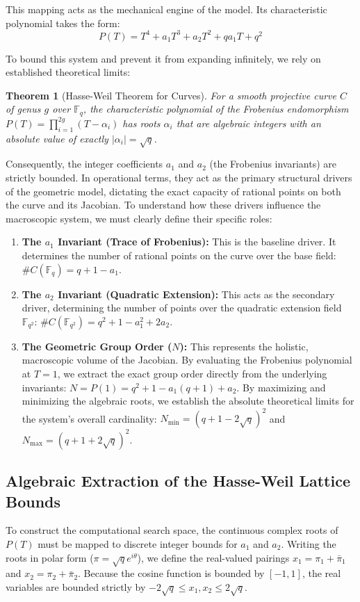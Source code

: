 \documentclass[11pt,letterpaper]{article}
\newtheorem{theorem}{Theorem}[section]
\begin{document}
This mapping acts as the mechanical engine of the model. Its characteristic polynomial takes the form:
\[ P(T) = T^4 + a_1 T^3 + a_2 T^2 + q a_1 T + q^2 \]

To bound this system and prevent it from expanding infinitely, we rely on established theoretical limits:

\begin{theorem}[Hasse-Weil Theorem for Curves]
For a smooth projective curve $C$ of genus $g$ over $\mathbb{F}_q$, the characteristic polynomial of the Frobenius endomorphism $P(T) = \prod_{i=1}^{2g} (T - \alpha_i)$ has roots $\alpha_i$ that are algebraic integers with an absolute value of exactly $|\alpha_i| = \sqrt{q}$.
\end{theorem}

Consequently, the integer coefficients $a_1$ and $a_2$ (the Frobenius invariants) are strictly bounded. In operational terms, they act as the primary structural drivers of the geometric model, dictating the exact capacity of rational points on both the curve and its Jacobian. To understand how these drivers influence the macroscopic system, we must clearly define their specific roles:

\begin{enumerate}
\item \textbf{The $a_1$ Invariant (Trace of Frobenius):} This is the baseline driver. It determines the number of rational points on the curve over the base field: $\#C(\mathbb{F}_q) = q + 1 - a_1$.
\item \textbf{The $a_2$ Invariant (Quadratic Extension):} This acts as the secondary driver, determining the number of points over the quadratic extension field $\mathbb{F}_{q^2}$: $\#C(\mathbb{F}_{q^2}) = q^2 + 1 - a_1^2 + 2a_2$.
\item \textbf{The Geometric Group Order ($N$):} This represents the holistic, macroscopic volume of the Jacobian. By evaluating the Frobenius polynomial at $T=1$, we extract the exact group order directly from the underlying invariants: $N = P(1) = q^2 + 1 - a_1(q + 1) + a_2$. By maximizing and minimizing the algebraic roots, we establish the absolute theoretical limits for the system's overall cardinality: $N_{\text{min}} = (q + 1 - 2\sqrt{q})^2$ and $N_{\text{max}} = (q + 1 + 2\sqrt{q})^2$.
\end{enumerate}

\subsection{Algebraic Extraction of the Hasse-Weil Lattice Bounds}
To construct the computational search space, the continuous complex roots of $P(T)$ must be mapped to discrete integer bounds for $a_1$ and $a_2$. Writing the roots in polar form ($\pi = \sqrt{q}e^{i\theta}$), we define the real-valued pairings $x_1 = \pi_1 + \bar{\pi}_1$ and $x_2 = \pi_2 + \bar{\pi}_2$. Because the cosine function is bounded by $[-1, 1]$, the real variables are bounded strictly by $-2\sqrt{q} \le x_1, x_2 \le 2\sqrt{q}$. 
\end{document}
